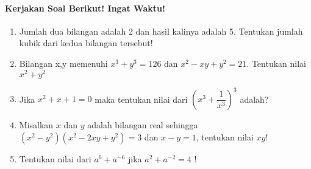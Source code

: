 \documentclass[12pt,a4paper,draft,final,oneside,twoside,openright,openany]{article}
\begin{document}
		\paragraph{Kerjakan Soal Berikut! Ingat Waktu!}
		\begin{enumerate}
			\item Jumlah dua bilangan adalah 2 dan hasil kalinya adalah 5. Tentukan jumlah kubik dari kedua bilangan tersebut!
			\item Bilangan x,y memenuhi $x^3+y^3=126$ dan $x^2-xy+y^2=21$. Tentukan nilai $x^2+y^2$
			\item Jika $x^2+x+1=0$ maka tentukan nilai dari $(x^3+\dfrac{1}{x^3})^3$ adalah?
			\item Misalkan $x$ dan $y$ adalah bilangan real sehingga\\ $(x^2-y^2)(x^2-2xy+y^2)=3$
			dan $x-y=1$, tentukan nilai $xy$!
			\item Tentukan nilai dari $a^6+a^{-6}$ jika $a^2+a^{-2}=4$  !
		
		\end{enumerate}
\end{document}
